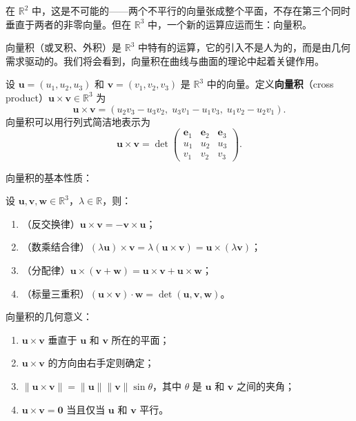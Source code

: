 在 $\mathbb{R}^2$ 中，这是不可能的——两个不平行的向量张成整个平面，不存在第三个同时垂直于两者的非零向量。但在 $\mathbb{R}^3$ 中，一个新的运算应运而生：向量积。

向量积（或叉积、外积）是 $\mathbb{R}^3$ 中特有的运算，它的引入不是人为的，而是由几何需求驱动的。我们将会看到，向量积在曲线与曲面的理论中起着关键作用。

\begin{Definition}[向量积]\label{def:cross-product-ch1}
设 $\mathbf{u} = (u_1, u_2, u_3)$ 和 $\mathbf{v} = (v_1, v_2, v_3)$ 是 $\mathbb{R}^3$ 中的向量。定义\textbf{向量积}（cross product）$\mathbf{u} \times \mathbf{v} \in \mathbb{R}^3$ 为
\[
\mathbf{u} \times \mathbf{v} = (u_2 v_3 - u_3 v_2,\; u_3 v_1 - u_1 v_3,\; u_1 v_2 - u_2 v_1).
\]
向量积可以用行列式简洁地表示为
\[
\mathbf{u} \times \mathbf{v} = \det\begin{pmatrix}
\mathbf{e}_1 & \mathbf{e}_2 & \mathbf{e}_3 \\
u_1 & u_2 & u_3 \\
v_1 & v_2 & v_3
\end{pmatrix}.
\]
\end{Definition}

向量积的基本性质：

\begin{Proposition}[向量积的性质]\label{prop:cross-product-ch1}
设 $\mathbf{u}, \mathbf{v}, \mathbf{w} \in \mathbb{R}^3$，$\lambda \in \mathbb{R}$，则：
\begin{enumerate}
\item（反交换律）$\mathbf{u} \times \mathbf{v} = -\mathbf{v} \times \mathbf{u}$；
\item（数乘结合律）$(\lambda \mathbf{u}) \times \mathbf{v} = \lambda (\mathbf{u} \times \mathbf{v}) = \mathbf{u} \times (\lambda \mathbf{v})$；
\item（分配律）$\mathbf{u} \times (\mathbf{v} + \mathbf{w}) = \mathbf{u} \times \mathbf{v} + \mathbf{u} \times \mathbf{w}$；
\item（标量三重积）$(\mathbf{u} \times \mathbf{v}) \cdot \mathbf{w} = \det(\mathbf{u}, \mathbf{v}, \mathbf{w})$。
\end{enumerate}
\end{Proposition}

向量积的几何意义：

\begin{Proposition}[向量积的几何意义]\label{prop:cross-product-geometry-ch1}
\begin{enumerate}
\item $\mathbf{u} \times \mathbf{v}$ 垂直于 $\mathbf{u}$ 和 $\mathbf{v}$ 所在的平面；
\item $\mathbf{u} \times \mathbf{v}$ 的方向由右手定则确定；
\item $\|\mathbf{u} \times \mathbf{v}\| = \|\mathbf{u}\| \|\mathbf{v}\| \sin\theta$，其中 $\theta$ 是 $\mathbf{u}$ 和 $\mathbf{v}$ 之间的夹角；
\item $\mathbf{u} \times \mathbf{v} = \mathbf{0}$ 当且仅当 $\mathbf{u}$ 和 $\mathbf{v}$ 平行。
\end{enumerate}
\end{Proposition}

